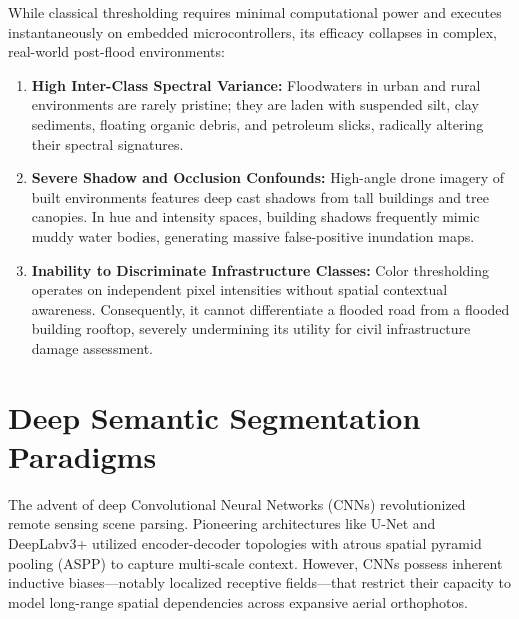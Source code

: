 While classical thresholding requires minimal computational power and executes instantaneously on embedded microcontrollers, its efficacy collapses in complex, real-world post-flood environments:
\begin{enumerate}
    \item \textbf{High Inter-Class Spectral Variance:} Floodwaters in urban and rural environments are rarely pristine; they are laden with suspended silt, clay sediments, floating organic debris, and petroleum slicks, radically altering their spectral signatures.
    \item \textbf{Severe Shadow and Occlusion Confounds:} High-angle drone imagery of built environments features deep cast shadows from tall buildings and tree canopies. In hue and intensity spaces, building shadows frequently mimic muddy water bodies, generating massive false-positive inundation maps.
    \item \textbf{Inability to Discriminate Infrastructure Classes:} Color thresholding operates on independent pixel intensities without spatial contextual awareness. Consequently, it cannot differentiate a flooded road from a flooded building rooftop, severely undermining its utility for civil infrastructure damage assessment.
\end{enumerate}

\section{Deep Semantic Segmentation Paradigms}
The advent of deep Convolutional Neural Networks (CNNs) revolutionized remote sensing scene parsing. Pioneering architectures like U-Net and DeepLabv3+ utilized encoder-decoder topologies with atrous spatial pyramid pooling (ASPP) to capture multi-scale context. However, CNNs possess inherent inductive biases—notably localized receptive fields—that restrict their capacity to model long-range spatial dependencies across expansive aerial orthophotos.

